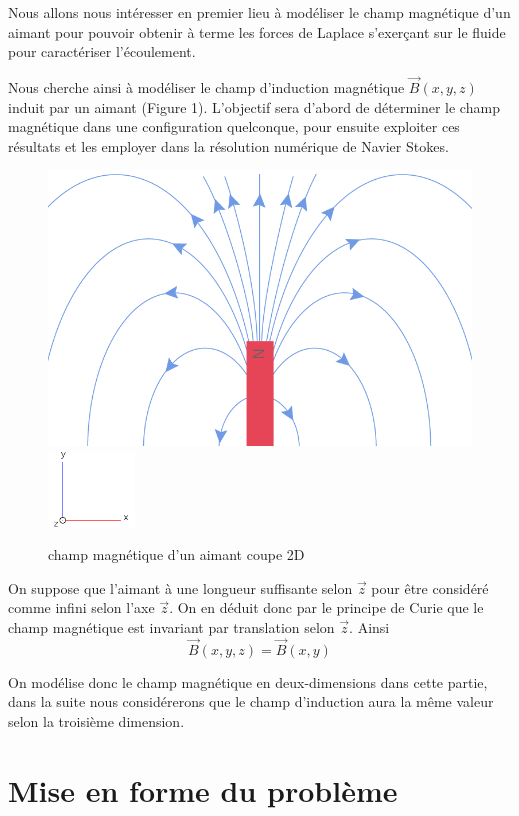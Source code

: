 \documentclass[a4paper,12pt,titlepage]{report}
\begin{document}
\begin{onehalfspace}
Nous allons nous intéresser en premier lieu à modéliser le champ magnétique d'un aimant pour pouvoir obtenir à terme les forces de Laplace s'exerçant sur le fluide pour caractériser l'écoulement.

Nous cherche ainsi à modéliser le champ d'induction magnétique $\vec{B}(x,y,z)$ induit par un aimant (Figure 1). L'objectif sera d'abord de déterminer le champ magnétique dans une configuration quelconque, pour ensuite exploiter ces résultats et les employer dans la résolution numérique de Navier Stokes. \\
\begin{figure}[h]
\begin{center}
\includegraphics[height =4 cm, keepaspectratio]{graphes/champ_aimant1.png} %
\includegraphics[height = 2cm, keepaspectratio]{graphes/axes.png}
\caption{champ magnétique d'un aimant coupe 2D}
\label{figure 1}
\end{center}
\end{figure}

On suppose que l'aimant à une longueur suffisante selon $\vec{z}$ pour être considéré comme infini selon l'axe $\vec{z}$.
On en déduit donc par le principe de Curie que le champ magnétique est invariant par translation selon $\vec{z}$. 
Ainsi \[\vec{B}(x,y,z) = \vec{B}(x,y)\]

On modélise donc le champ magnétique en deux-dimensions dans cette partie, dans la suite nous considérerons que le champ d'induction aura la même valeur selon la troisième dimension.
\section{Mise en forme du problème}


\end{onehalfspace}
\end{document}
